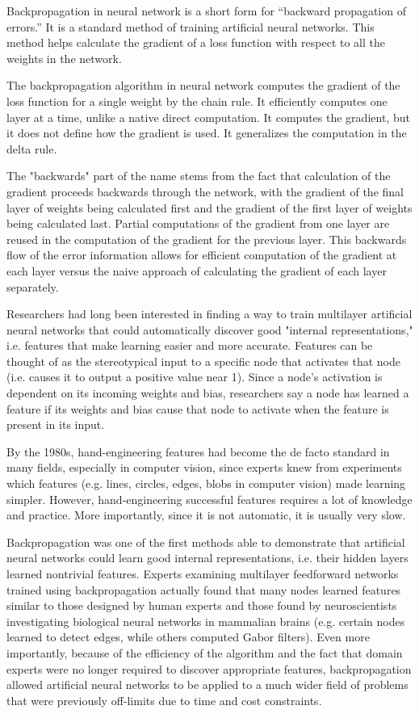 \documentclass[14pt, a4paper]{article}
\numberwithin{equation}{section}
\numberwithin{algorithm}{section}
\numberwithin{figure}{section}
\begin{document}
Backpropagation in neural network is a short form for “backward propagation of errors.” 
It is a standard method of training artificial neural networks. 
This method helps calculate the gradient of a loss function with respect to all the weights in the network.

The backpropagation algorithm in neural network computes the gradient of the loss function for a single weight by the chain rule. 
It efficiently computes one layer at a time, unlike a native direct computation. 
It computes the gradient, but it does not define how the gradient is used. 
It generalizes the computation in the delta rule.

The "backwards" part of the name stems from the fact that calculation of the gradient proceeds backwards through the network, with the gradient of the final layer of weights being calculated first and the gradient of the first layer of weights being calculated last. 
Partial computations of the gradient from one layer are reused in the computation of the gradient for the previous layer. 
This backwards flow of the error information allows for efficient computation of the gradient at each layer versus the naive approach of calculating the gradient of each layer separately.

Researchers had long been interested in finding a way to train multilayer artificial neural networks that could automatically discover good "internal representations," i.e. features that make learning easier and more accurate. 
Features can be thought of as the stereotypical input to a specific node that activates that node (i.e. causes it to output a positive value near 1). 
Since a node's activation is dependent on its incoming weights and bias, researchers say a node has learned a feature if its weights and bias cause that node to activate when the feature is present in its input.

By the 1980s, hand-engineering features had become the de facto standard in many fields, especially in computer vision, since experts knew from experiments which features (e.g. lines, circles, edges, blobs in computer vision) made learning simpler. 
However, hand-engineering successful features requires a lot of knowledge and practice. More importantly, since it is not automatic, it is usually very slow.

Backpropagation was one of the first methods able to demonstrate that artificial neural networks could learn good internal representations, i.e. their hidden layers learned nontrivial features. 
Experts examining multilayer feedforward networks trained using backpropagation actually found that many nodes learned features similar to those designed by human experts and those found by neuroscientists investigating biological neural networks in mammalian brains (e.g. certain nodes learned to detect edges, while others computed Gabor filters). Even more importantly, because of the efficiency of the algorithm and the fact that domain experts were no longer required to discover appropriate features, backpropagation allowed artificial neural networks to be applied to a much wider field of problems that were previously off-limits due to time and cost constraints.
\end{document}
